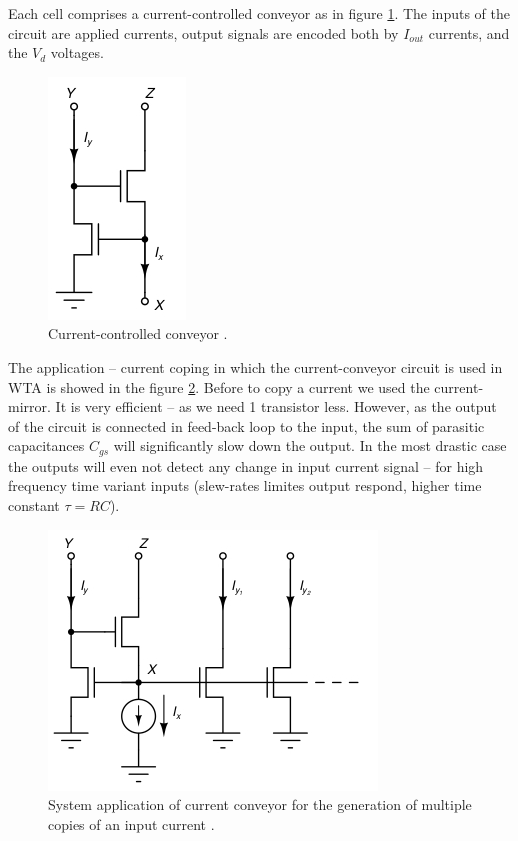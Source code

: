 \documentclass[main]{subfiles}
\begin{document}
Each cell comprises a current-controlled conveyor as in figure \ref{fig:current_conveyor}. The inputs of the circuit are applied currents,
output signals are encoded both by $I_{out}$ currents, and the $V_d$ voltages. 

\begin{figure}[htbp]
  \centering
  \includegraphics[scale=0.8]{figs/current_conveyor.jpg}
  \caption{Current-controlled conveyor \cite{book:VLSI}.}
  \label{fig:current_conveyor}
\end{figure} 

The application -- current coping in which the current-conveyor circuit is used in WTA is showed in the figure \ref{fig:current_conveyor_application}. Before to copy a current we used the current-mirror. It is very efficient -- as we need 1 transistor less. However, as the output of the circuit is connected in feed-back loop to the input, the sum of parasitic capacitances $C_{gs}$ will significantly slow down the output. In the most drastic case the outputs will even not detect any change in input current signal -- for high frequency time variant inputs (slew-rates limites output respond, higher time constant $\tau = RC$).

\begin{figure}[htbp]
  \centering
  \includegraphics[scale=0.8]{figs/current_conveyor_application.jpg}
  \caption{System application of current conveyor for the generation of multiple copies of an input current \cite{book:VLSI}.}
  \label{fig:current_conveyor_application}
\end{figure} 
\end{document}
